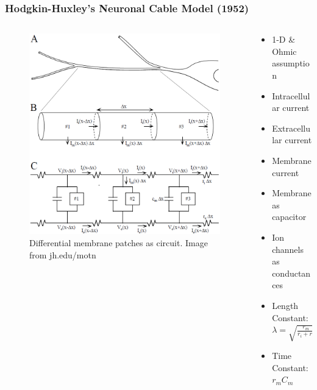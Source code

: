 \documentclass{beamer}
\begin{document}
\begin{frame}
\frametitle{Hodgkin-Huxley's Neuronal Cable Model (1952)}
\begin{columns}
\begin{column}{.65\textwidth}
\begin{figure}
\includegraphics[scale=0.35]{NeuronalCableModel}
\caption{Differential membrane patches as circuit. Image from jh.edu/motn}
\end{figure}
\end{column}

\begin{column}{.45\textwidth}
\begin{itemize}
	\item{1-D \& Ohmic assumption}
	\item{Intracellular current}
	\item{Extracellular current}
	\item{Membrane current}
	\item{Membrane as capacitor}
	\item{Ion channels as conductances}
	\item{Length Constant: $\lambda = \sqrt{\frac{r_m}{r_i+r_e}}$}
	\item{Time Constant: $r_mC_m$ }
\end{itemize}
\end{column}
\end{columns}
\end{frame}
\end{document}
